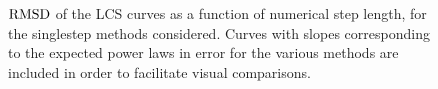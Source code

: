 \begin{figure}[htpb]
    \centering
    
    \caption[$\rmsd$ of the LCS curves as a function of numerical step length,
                for the singlestep methods considered]
                {$\rmsd$ of the LCS curves as a function of numerical step
                length, for the singlestep methods considered. Curves with
                slopes corresponding to the expected power laws in error for the
                various methods are included in order to facilitate visual
                comparisons.}
    \label{fig:lcs_err_fixed}
\end{figure}
